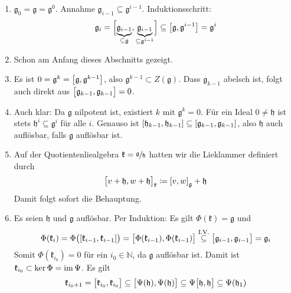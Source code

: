 \begin{beweis}
	\begin{enumerate}[1),itemsep=0pt]
		\item $\mathfrak{g}_0 = \mathfrak{g} = \mathfrak{g}^0$.
		Annahme $\mathfrak{g}_{i-1} \subseteq \mathfrak{g}^{i-1}$. Induktionsschritt:
		\[
			\mathfrak{g}_i = \benbrace[\Big]{\Underbrace{\mathfrak{g}_{i-1}}{\subseteq \mathfrak{g}}, \Underbrace{\mathfrak{g}_{i-1}}{\subseteq \mathfrak{g}^{i-1}}} \subseteq \benbrace*{\mathfrak{g},\mathfrak{g}^{i-1}} = \mathfrak{g}^i
		\]
		\item Schon am Anfang dieses Abschnitts gezeigt.
		\item Es ist $0 = \mathfrak{g}^k = \benbrace*{\mathfrak{g}, \mathfrak{g}^{k-1}}$, also $\mathfrak{g}^{k-1} \subset Z(\mathfrak{g})$.
		Dass $\mathfrak{g}_{k-1}$ abelsch ist, folgt auch direkt aus $\benbrace[\big]{\mathfrak{g}_{k-1}, \mathfrak{g}_{k-1}}=0$.
		\item Auch klar: Da $\mathfrak{g}$ nilpotent ist, existiert $k$ mit $\mathfrak{g}^k =0$.
		Für ein Ideal $0 \neq \mathfrak{h}$ ist stets $\mathfrak{h}^i \subseteq \mathfrak{g}^i$ für alle $i$.
		Genauso ist $\benbrace*{\mathfrak{h}_{k-1}, \mathfrak{h}_{k-1}} \subseteq \benbrace*{\mathfrak{g}_{k-1}, \mathfrak{g}_{k-1}}$, also $\mathfrak{h}$ auch auflösbar, falls $\mathfrak{g}$ auflösbar ist.
		\item Auf der Quotientenliealgebra $\mathfrak{k} = \sfrac{\mathfrak{g}}{\mathfrak{h}}$ hatten wir die Lieklammer definiert durch
		\[
			\benbrace[\big]{v +\mathfrak{h}, w + \mathfrak{h}}_{\mathfrak{k}} \coloneqq \benbrace*{v,w}_{\mathfrak{g}} + \mathfrak{h} 
		\]
		Damit folgt sofort die Behauptung.
		\item Es seien $\mathfrak{h}$ und $\mathfrak{g}$ auflösbar. Per Induktion:
		Es gilt $\Phi(\mathfrak{k}) = \mathfrak{g}$ und 
		\[
			\Phi(\mathfrak{k}_i) = \Phi \enbrace[\big]{\benbrace*{\mathfrak{k}_{i-1}, \mathfrak{k}_{i-1}}} = \benbrace[\big]{\Phi(\mathfrak{k}_{i-1}), \Phi(\mathfrak{k}_{i-1})}\StackText{I.V.}{\subseteq} \benbrace[\big]{\mathfrak{g}_{i-1}, \mathfrak{g}_{i-1}} = \mathfrak{g}_i
		\]
		Somit $\Phi(\mathfrak{k}_{i_0})=0$ für ein $i_0 \in \mathbb{N}$, da $\mathfrak{g}$ auflösbar ist.
		Damit ist $\mathfrak{k}_{i_0} \subset \ker \Phi = \im \Psi$. 
		Es gilt
		\[
			\mathfrak{k}_{i_0 +1} = \benbrace[\big]{\mathfrak{k}_{i_0}, \mathfrak{k}_{i_0}} \subseteq \benbrace[\big]{\Psi(\mathfrak{h}), \Psi(\mathfrak{h})} \subseteq \Psi \benbrace[\big]{\mathfrak{h},\mathfrak{h}} \subseteq \Psi(\mathfrak{h}_1)
\]
\end{enumerate}
\end{beweis}
